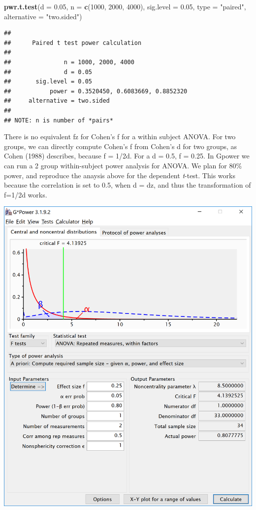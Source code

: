 \documentclass[]{book}
\newenvironment{Shaded}{\begin{snugshade}}{\end{snugshade}}
\newcommand{\DataTypeTok}[1]{\textcolor[rgb]{0.13,0.29,0.53}{#1}}
\newcommand{\DecValTok}[1]{\textcolor[rgb]{0.00,0.00,0.81}{#1}}
\newcommand{\FloatTok}[1]{\textcolor[rgb]{0.00,0.00,0.81}{#1}}
\newcommand{\KeywordTok}[1]{\textcolor[rgb]{0.13,0.29,0.53}{\textbf{#1}}}
\newcommand{\NormalTok}[1]{#1}
\newcommand{\StringTok}[1]{\textcolor[rgb]{0.31,0.60,0.02}{#1}}
\begin{document}
\begin{Shaded}
\begin{Highlighting}[]
\KeywordTok{pwr.t.test}\NormalTok{(}\DataTypeTok{d =} \FloatTok{0.05}\NormalTok{,}
           \DataTypeTok{n =} \KeywordTok{c}\NormalTok{(}\DecValTok{1000}\NormalTok{, }\DecValTok{2000}\NormalTok{, }\DecValTok{4000}\NormalTok{),}
           \DataTypeTok{sig.level =} \FloatTok{0.05}\NormalTok{,}
           \DataTypeTok{type =} \StringTok{"paired"}\NormalTok{,}
           \DataTypeTok{alternative =} \StringTok{"two.sided"}\NormalTok{)}
\end{Highlighting}
\end{Shaded}

\begin{verbatim}
## 
##      Paired t test power calculation 
## 
##               n = 1000, 2000, 4000
##               d = 0.05
##       sig.level = 0.05
##           power = 0.3520450, 0.6083669, 0.8852320
##     alternative = two.sided
## 
## NOTE: n is number of *pairs*
\end{verbatim}

There is no equivalent fz for Cohen's f for a within subject ANOVA. For two groups, we can directly compute Cohen's f from Cohen's d for two groups, as Cohen (1988) describes, because f = 1/2d. For a d = 0.5, f = 0.25. In Gpower we can run a 2 group within-subject power analysis for ANOVA. We plan for 80\% power, and reproduce the anaysis above for the dependent \emph{t}-test. This works because the correlation is set to 0.5, when d = dz, and thus the transformation of f=1/2d works.

\includegraphics{screenshots/gpower_1.png}
\end{document}
